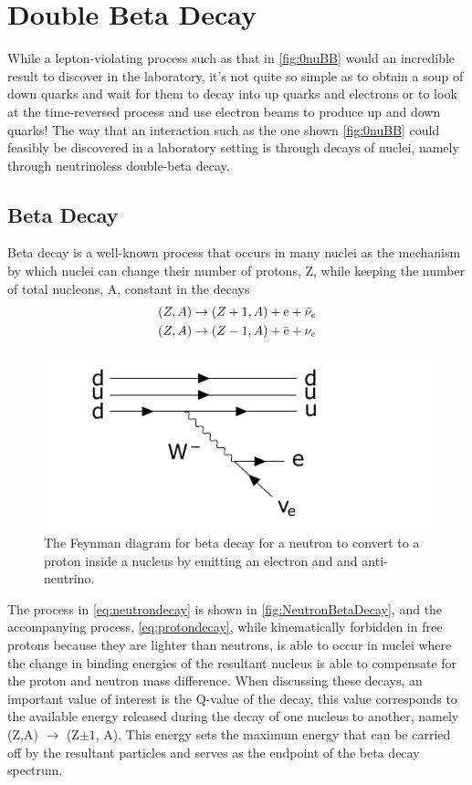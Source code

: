 \chapter{Double Beta Decay}
\label{chap:Beta Decay}

While a lepton-violating process such as that in \autoref{fig:0nuBB} would an incredible result to discover in the laboratory, it's not quite so simple as to obtain a soup of down quarks and wait for them to decay into up quarks and electrons or to look at the time-reversed process and use electron beams to produce up and down quarks! The way that an interaction such as the one shown \autoref{fig:0nuBB} could feasibly be discovered in a laboratory setting is through decays of nuclei, namely through neutrinoless double-beta decay. 

\section{Beta Decay}
\label{sec:Beta Decay}
Beta decay is a well-known process that occurs in many nuclei as the mechanism by which nuclei can change their number of protons, Z, while keeping the number of total nucleons, A, constant in the decays
\begin{align}
    (Z, A) & \rightarrow (Z+1, A)+\textrm{e}+\Bar{\nu}_e \label{eq:neutrondecay} \\
    (Z, A) & \rightarrow (Z-1, A)+\Bar{\textrm{e}}+\nu_e \label{eq:protondecay} 
\end{align}

\begin{figure}[tbph]
    \centering
    \includegraphics[width=0.8\linewidth]{Figures/NeutronBetaDecay.pdf}
    \caption[Beta Decay Feynman diagram for a neutron converting to a proton]{The Feynman diagram for beta decay for a neutron to convert to a proton inside a nucleus by emitting an electron and and anti-neutrino.}
    \label{fig:NeutronBetaDecay}
\end{figure}

The process in \autoref{eq:neutrondecay} is shown in \autoref{fig:NeutronBetaDecay}, and the accompanying process, \autoref{eq:protondecay}, while kinematically forbidden in free protons because they are lighter than neutrons, is able to occur in nuclei where the change in binding energies of the resultant nucleus is able to compensate for the proton and neutron mass difference. When discussing these decays, an important value of interest is the Q-value of the decay, this value corresponds to the available energy released during the decay of one nucleus to another, namely (Z,A) $\rightarrow$ (Z$\pm1$, A). This energy sets the maximum energy that can be carried off by the resultant particles and serves as the endpoint of the beta decay spectrum. 


